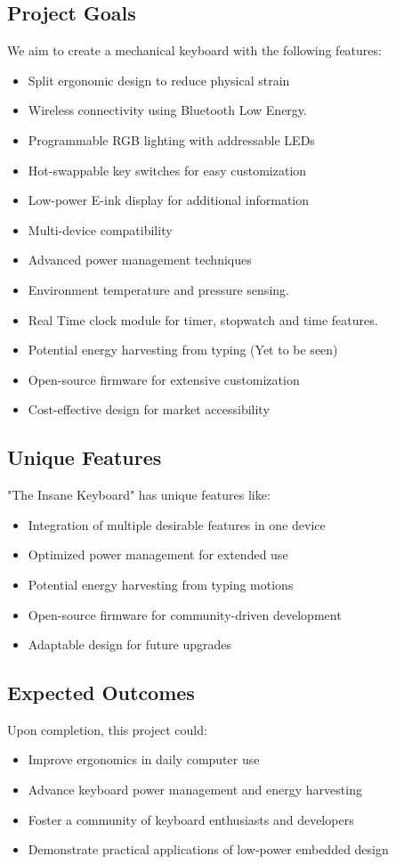 \documentclass[a4paper,11pt]{article}%
\begin{document}
\subsection{Project Goals}
We aim to create a mechanical keyboard with the following features:
\begin{itemize}
    \item Split ergonomic design to reduce physical strain
    \item Wireless connectivity using Bluetooth Low Energy.
    \item Programmable RGB lighting with addressable LEDs
    \item Hot-swappable key switches for easy customization
    \item Low-power E-ink display for additional information
    \item Multi-device compatibility
    \item Advanced power management techniques
    \item Environment temperature and pressure sensing.
    \item Real Time clock module for timer, stopwatch and time features.
    \item Potential energy harvesting from typing (Yet to be seen)
    \item Open-source firmware for extensive customization
    \item Cost-effective design for market accessibility
\end{itemize}

\subsection{Unique Features}
"The Insane Keyboard" has unique features like:
\begin{itemize}
    \item Integration of multiple desirable features in one device
    \item Optimized power management for extended use
    \item Potential energy harvesting from typing motions
    \item Open-source firmware for community-driven development
    \item Adaptable design for future upgrades
\end{itemize}

\subsection{Expected Outcomes}
Upon completion, this project could:
\begin{itemize}
    \item Improve ergonomics in daily computer use
    \item Advance keyboard power management and energy harvesting
    \item Foster a community of keyboard enthusiasts and developers
    \item Demonstrate practical applications of low-power embedded design
\end{itemize}
\end{document}
